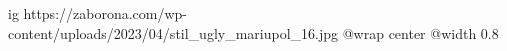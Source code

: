 
 
 
 
 

\ifcmt
  ig https://zaborona.com/wp-content/uploads/2023/04/stil_ugly_mariupol_16.jpg
  @wrap center
  @width 0.8
\fi
